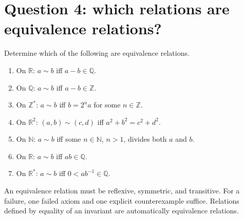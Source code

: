\documentclass[11pt,openany]{book}
\newcommand{\N}{\mathbb N}\newcommand{\Z}{\mathbb Z}
\newcommand{\Q}{\mathbb Q}\newcommand{\R}{\mathbb R}
\begin{document}
\section{Question 4: which relations are equivalence relations?}
\begin{questionbox}
Determine which of the following are equivalence relations.
\begin{enumerate}[label=(\roman*)]
\item On $\R$: $a\sim b$ iff $a-b\in\Q$.
\item On $\Q$: $a\sim b$ iff $a-b\in\Z$.
\item On $\Z^*$: $a\sim b$ iff $b=2^na$ for some $n\in\Z$.
\item On $\R^2$: $(a,b)\sim(c,d)$ iff $a^2+b^2=c^2+d^2$.
\item On $\N$: $a\sim b$ iff some $n\in\N$, $n>1$, divides both $a$ and $b$.
\item On $\R$: $a\sim b$ iff $ab\in\Q$.
\item On $\R^*$: $a\sim b$ iff $0<ab^{-1}\in\Q$.
\end{enumerate}
\end{questionbox}
\begin{approachbox}
An equivalence relation must be reflexive, symmetric, and transitive. For a failure, one failed axiom and one explicit counterexample suffice. Relations defined by equality of an invariant are automatically equivalence relations.
\end{approachbox}
\end{document}
